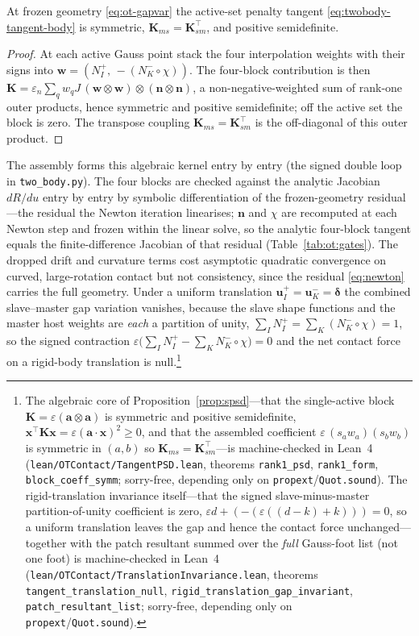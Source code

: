 \documentclass{svjour3}                 %
\newcommand{\nbf}{\bm{n}}
\newcommand{\ubf}{\bm{u}}
\newcommand{\code}[1]{\texttt{#1}}
\begin{document}
\begin{proposition}\label{prop:spsd}
At frozen geometry \eqref{eq:ot-gapvar} the active-set penalty tangent \eqref{eq:twobody-tangent-body} is symmetric,
$\bm K_{ms}=\bm K_{sm}^{\top}$, and positive semidefinite.
\end{proposition}
\begin{proof}
At each active Gauss point stack the four interpolation weights with their signs into
$\bm w=(N_I^+,\,-(N_K^-\!\circ\chi))$. The four-block contribution is then
$\bm K=\varepsilon_n\sum_q w_q J\,(\bm w\otimes\bm w)\otimes(\nbf\otimes\nbf)$, a non-negative-weighted sum of
rank-one outer products, hence symmetric and positive semidefinite; off the active set the block is zero. The
transpose coupling $\bm K_{ms}=\bm K_{sm}^{\top}$ is the off-diagonal of this outer product.
\end{proof}

The assembly forms this algebraic kernel entry by entry (the signed double loop in
\code{two\_body.py}). The four blocks are checked against the analytic Jacobian $dR/du$ entry by entry by symbolic
differentiation of the frozen-geometry residual---the residual the Newton iteration linearises; $\nbf$ and $\chi$
are recomputed at each Newton step and frozen within the linear solve, so the analytic four-block tangent equals
the finite-difference Jacobian of that residual (Table~\ref{tab:ot:gates}). The dropped
drift and curvature terms cost asymptotic quadratic convergence on curved, large-rotation contact but not
consistency, since the residual \eqref{eq:newton} carries the full geometry. Under a uniform translation
$\ubf_I^+=\ubf_K^-=\bm\delta$ the combined slave--master gap variation vanishes, because the slave shape
functions and the master host weights are \emph{each} a partition of unity,
$\sum_I N_I^+=\sum_K(N_K^-\!\circ\chi)=1$, so the signed contraction
$\varepsilon\big(\sum_I N_I^+-\sum_K N_K^-\!\circ\chi\big)=0$ and the net contact force on a rigid-body
translation is null.\footnote{The algebraic core of Proposition~\ref{prop:spsd}---that the single-active block
$\bm K=\varepsilon(\bm a\otimes\bm a)$ is symmetric and positive semidefinite,
$\bm x^{\top}\bm K\bm x=\varepsilon(\bm a\cdot\bm x)^2\ge0$, and that the assembled coefficient
$\varepsilon\,(s_aw_a)(s_bw_b)$ is symmetric in $(a,b)$ so $\bm K_{ms}=\bm K_{sm}^{\top}$---is machine-checked in
Lean~4 (\code{lean/OTContact/TangentPSD.lean}, theorems \code{rank1\_psd}, \code{rank1\_form},
\code{block\_coeff\_symm}; sorry-free, depending only on \code{propext}/\code{Quot.sound}). The rigid-translation
invariance itself---that the signed slave-minus-master partition-of-unity coefficient is zero,
$\varepsilon d+(-(\varepsilon((d{-}k){+}k)))=0$, so a uniform translation leaves the gap and hence the contact
force unchanged---together with the patch resultant summed over the \emph{full} Gauss-foot list (not one foot)
is machine-checked in Lean~4 (\code{lean/OTContact/TranslationInvariance.lean}, theorems
\code{tangent\_translation\_null}, \code{rigid\_translation\_gap\_invariant}, \code{patch\_resultant\_list};
sorry-free, depending only on \code{propext}/\code{Quot.sound}).}
\end{document}
